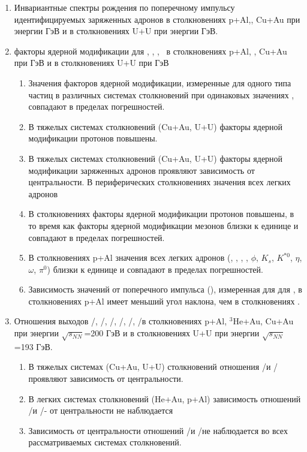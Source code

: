 {}
\begin{enumerate}[beginpenalty=10000] %
	\item 	Инвариантные спектры рождения по поперечному импульсу идентифицируемых заряженных адронов в столкновениях  p+Al,\heau, Cu+Au при энергии  ГэВ и в столкновениях U+U при энергии  ГэВ. \autocite{Gosele1999161,Lermontov}
	\item 	факторы ядерной модификации для \pipm, \Kpm, \prot, \aprot\, в столкновениях  p+Al, \heau, Cu+Au при  ГэВ и в столкновениях U+U при  ГэВ
		\begin{enumerate} 
			\item 	Значения факторов ядерной модификации, измеренные для одного типа частиц в различных системах столкновений при одинаковых значениях \Npart, совпадают в пределах погрешностей.
			\item В тяжелых системах столкновений  (Cu+Au, U+U) факторы ядерной модификации протонов повышены.
			\item В тяжелых системах столкновений  (Cu+Au, U+U) факторы ядерной модификации заряженных адронов проявляют зависимость от центральности. В периферических столкновениях значения \rab всех легких адронов 
			\item В столкновениях \heau  факторы ядерной модификации протонов повышены, в то время как факторы ядерной модификации мезонов близки к единице и совпадают в пределах погрешностей.
			\item 	В столкновениях p+Al значения \rab всех легких адронов (\pipm, \Kpm, \prot, \aprot, $\phi$, $K_s$, $K^{*0}$, $\eta$, $\omega$, $\pi^0$) близки к единице и совпадают в пределах погрешностей.
			\item 	Зависимость значений \rab от поперечного импульса (\pt), измеренная для для \Kpm, \pipm  в столкновениях p+Al имеет меньший угол наклона, чем в столкновениях \heau.
		\end{enumerate}
	
	\item Отношения выходов \pim/\pip, \Km/\Kp, \prot/\aprot, \prot/\pip, \aprot/\pim, \Kp/\Km в столкновениях  p+Al, $^{3}$He+Au, Cu+Au при энергии $\sqrt{s_{NN}}$=200 ГэВ и в столкновениях U+U при энергии $\sqrt{s_{NN}}$=193 ГэВ.
		\begin{enumerate}
			\item 	В тяжелых системах (Cu+Au, U+U) столкновений отношения \prot/\pip   и \aprot/\pim проявляют зависимость от центральности. 
			\item 	В легких системах столкновений (He+Au, p+Al) зависимость отношений \prot/\pip   и \aprot/\pim - от центральности не наблюдается
			\item 	Зависимость от центральности отношений \Kp/\pip и \Km/\pim не наблюдается во всех рассматриваемых системах столкновений.
		\end{enumerate}

\end{enumerate}


